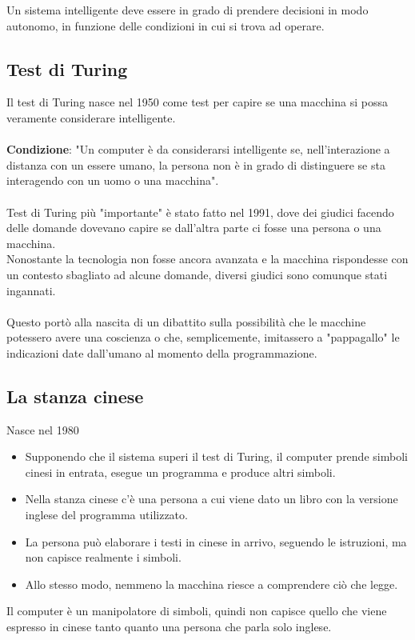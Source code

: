 \documentclass[../main.tex]{subfiles}
\begin{document}
	Un sistema intelligente deve essere in grado di prendere decisioni in
	modo autonomo, in funzione delle condizioni in cui si trova ad
	operare.
	\subsection{Test di Turing}
	Il test di Turing nasce nel 1950 come test per capire se una macchina si possa veramente considerare intelligente.\\ \\
	\textbf{Condizione}: "Un computer è da considerarsi intelligente se, nell'interazione a distanza con un essere umano, la persona non è in grado di distinguere se sta interagendo con un uomo o una macchina".\\ \\
	Test di Turing più "importante" è stato fatto nel 1991, dove dei giudici facendo delle domande dovevano capire se dall'altra parte ci fosse una persona o una macchina.\\
	Nonostante la tecnologia non fosse ancora avanzata e la macchina rispondesse con un contesto sbagliato ad alcune domande, diversi giudici sono comunque stati ingannati.\\ \\
	Questo portò alla nascita di un dibattito sulla possibilità che le macchine potessero avere una coscienza o che, semplicemente, imitassero a "pappagallo" le indicazioni date dall'umano al momento della programmazione.
	\subsection{La stanza cinese}
	Nasce nel 1980\\
	\begin{itemize}
		\item Supponendo che il sistema superi il test di Turing, il computer prende simboli cinesi in entrata, esegue un programma e produce altri simboli.
		\item Nella stanza cinese c’è una persona a cui viene dato un libro con la versione inglese del programma utilizzato.
		\item La persona può elaborare i testi in cinese in arrivo, seguendo le istruzioni, ma non capisce realmente i simboli.
		\item Allo stesso modo, nemmeno la macchina riesce a comprendere ciò che legge.
	\end{itemize}
	Il computer è un manipolatore di simboli, quindi non capisce quello che viene espresso in cinese tanto quanto una persona che parla solo inglese.
\end{document}
